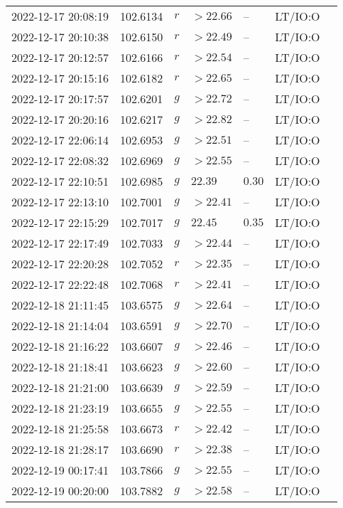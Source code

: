 \documentclass{nature_plusfigure}
\begin{document}
\begin{supplement}
\begin{center}
\begin{longtable}{lllllll}
2022-12-17 20:08:19 & 102.6134 & $r$ & $>22.66$ & -- & LT/IO:O &  \\ 
2022-12-17 20:10:38 & 102.6150 & $r$ & $>22.49$ & -- & LT/IO:O &  \\ 
2022-12-17 20:12:57 & 102.6166 & $r$ & $>22.54$ & -- & LT/IO:O &  \\ 
2022-12-17 20:15:16 & 102.6182 & $r$ & $>22.65$ & -- & LT/IO:O &  \\ 
2022-12-17 20:17:57 & 102.6201 & $g$ & $>22.72$ & -- & LT/IO:O &  \\ 
2022-12-17 20:20:16 & 102.6217 & $g$ & $>22.82$ & -- & LT/IO:O &  \\ 
2022-12-17 22:06:14 & 102.6953 & $g$ & $>22.51$ & -- & LT/IO:O &  \\ 
2022-12-17 22:08:32 & 102.6969 & $g$ & $>22.55$ & -- & LT/IO:O &  \\ 
2022-12-17 22:10:51 & 102.6985 & $g$ & $22.39$ & $0.30$ & LT/IO:O &  \\ 
2022-12-17 22:13:10 & 102.7001 & $g$ & $>22.41$ & -- & LT/IO:O &  \\ 
2022-12-17 22:15:29 & 102.7017 & $g$ & $22.45$ & $0.35$ & LT/IO:O &  \\ 
2022-12-17 22:17:49 & 102.7033 & $g$ & $>22.44$ & -- & LT/IO:O &  \\ 
2022-12-17 22:20:28 & 102.7052 & $r$ & $>22.35$ & -- & LT/IO:O &  \\ 
2022-12-17 22:22:48 & 102.7068 & $r$ & $>22.41$ & -- & LT/IO:O &  \\ 
2022-12-18 21:11:45 & 103.6575 & $g$ & $>22.64$ & -- & LT/IO:O &  \\ 
2022-12-18 21:14:04 & 103.6591 & $g$ & $>22.70$ & -- & LT/IO:O &  \\ 
2022-12-18 21:16:22 & 103.6607 & $g$ & $>22.46$ & -- & LT/IO:O &  \\ 
2022-12-18 21:18:41 & 103.6623 & $g$ & $>22.60$ & -- & LT/IO:O &  \\ 
2022-12-18 21:21:00 & 103.6639 & $g$ & $>22.59$ & -- & LT/IO:O &  \\ 
2022-12-18 21:23:19 & 103.6655 & $g$ & $>22.55$ & -- & LT/IO:O &  \\ 
2022-12-18 21:25:58 & 103.6673 & $r$ & $>22.42$ & -- & LT/IO:O &  \\ 
2022-12-18 21:28:17 & 103.6690 & $r$ & $>22.38$ & -- & LT/IO:O &  \\ 
2022-12-19 00:17:41 & 103.7866 & $g$ & $>22.55$ & -- & LT/IO:O &  \\ 
2022-12-19 00:20:00 & 103.7882 & $g$ & $>22.58$ & -- & LT/IO:O &  \\ 

\end{longtable}
\end{center}
\end{supplement}
\end{document}
